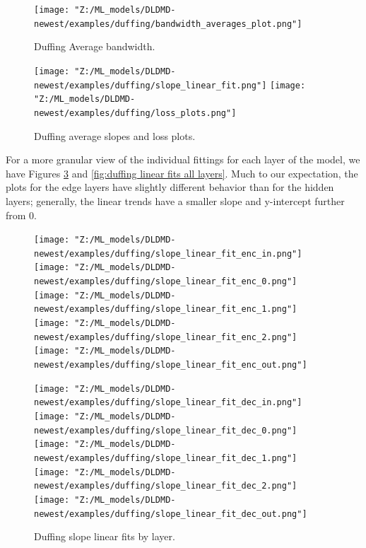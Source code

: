 \begin{figure}[ht]
    \centering
    \begin{minipage}{\textwidth}
        \texttt{[image: "Z:/ML\_models/DLDMD-newest/examples/duffing/bandwidth\_averages\_plot.png"]} 
    \end{minipage} 
    \caption{Duffing Average bandwidth.}
    \label{fig:duffing average bandwidth}
\end{figure}

\begin{figure}[ht]
    \centering
    \begin{minipage}{\textwidth}
        \texttt{[image: "Z:/ML\_models/DLDMD-newest/examples/duffing/slope\_linear\_fit.png"]} 
        \texttt{[image: "Z:/ML\_models/DLDMD-newest/examples/duffing/loss\_plots.png"]} 
    \end{minipage}%
    \caption{Duffing average slopes and loss plots.}
    \label{fig:duffing slopes and losses}
\end{figure}

For a more granular view of the individual fittings for each layer of the model, we have Figures 
\ref{fig:duffing slopes all layers} and \ref{fig:duffing linear fits all layers}. Much to our 
expectation, the plots for the edge layers have slightly different behavior than for the hidden layers;
generally, the linear trends have a smaller slope and y-intercept further from 0.

\begin{figure}[p]
    \centering
    \begin{minipage}{.5\textwidth}
        \texttt{[image: "Z:/ML\_models/DLDMD-newest/examples/duffing/slope\_linear\_fit\_enc\_in.png"]} 
        \texttt{[image: "Z:/ML\_models/DLDMD-newest/examples/duffing/slope\_linear\_fit\_enc\_0.png"]} 
        \texttt{[image: "Z:/ML\_models/DLDMD-newest/examples/duffing/slope\_linear\_fit\_enc\_1.png"]} 
        \texttt{[image: "Z:/ML\_models/DLDMD-newest/examples/duffing/slope\_linear\_fit\_enc\_2.png"]} 
        \texttt{[image: "Z:/ML\_models/DLDMD-newest/examples/duffing/slope\_linear\_fit\_enc\_out.png"]} 
    \end{minipage}%
    \begin{minipage}{.5\textwidth}
        \texttt{[image: "Z:/ML\_models/DLDMD-newest/examples/duffing/slope\_linear\_fit\_dec\_in.png"]} 
        \texttt{[image: "Z:/ML\_models/DLDMD-newest/examples/duffing/slope\_linear\_fit\_dec\_0.png"]} 
        \texttt{[image: "Z:/ML\_models/DLDMD-newest/examples/duffing/slope\_linear\_fit\_dec\_1.png"]} 
        \texttt{[image: "Z:/ML\_models/DLDMD-newest/examples/duffing/slope\_linear\_fit\_dec\_2.png"]} 
        \texttt{[image: "Z:/ML\_models/DLDMD-newest/examples/duffing/slope\_linear\_fit\_dec\_out.png"]} 
    \end{minipage}
    \caption{Duffing slope linear fits by layer.}
    \label{fig:duffing slopes all layers}
\end{figure}

